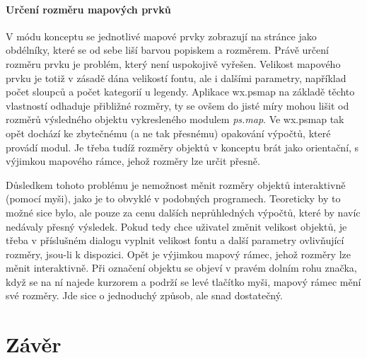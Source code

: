 \documentclass[a4paper,12pt,draft]{article}
\newcommand{\modul}[1]{\emph{#1}}
\begin{document}
 \paragraph*{Určení rozměru mapových prvků}
 V módu konceptu se jednotlivé mapové prvky zobrazují na stránce jako obdélníky, které se od sebe liší barvou popiskem a rozměrem. Právě určení rozměru prvku je problém, který není uspokojivě vyřešen. Velikost mapového prvku je totiž v zásadě dána velikostí fontu, ale i dalšími parametry, například počet sloupců a počet kategorií u legendy. Aplikace wx.psmap na základě těchto vlastností odhaduje přibližné rozměry, ty se ovšem do jisté míry mohou lišit od rozměrů výsledného objektu vykresleného modulem \modul{ps.map}. Ve wx.psmap tak opět dochází ke zbytečnému (a ne tak přesnému) opakování výpočtů, které provádí modul. Je třeba tudíž rozměry objektů v konceptu brát jako orientační, s výjimkou mapového rámce, jehož rozměry lze určit přesně.
 
 Důsledkem tohoto problému je nemožnost měnit rozměry objektů interaktivně (pomocí myši), jako je to obvyklé v podobných programech. Teoreticky by to možné sice bylo, ale pouze za cenu dalších neprůhledných výpočtů, které by navíc nedávaly přesný výsledek. Pokud tedy chce uživatel změnit velikost objektů, je třeba v příslušném dialogu vyplnit velikost fontu a další parametry ovlivňující rozměry, jsou-li k dispozici. Opět je výjimkou mapový rámec, jehož rozměry lze měnit interaktivně. Při označení objektu se objeví v pravém dolním rohu značka, když se na ní najede kurzorem a podrží se levé tlačítko myši, mapový rámec mění své rozměry. Jde sice o jednoduchý způsob, ale snad dostatečný.
 


\section{Závěr}
\end{document}
